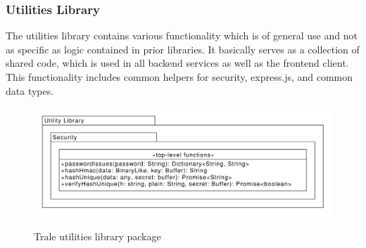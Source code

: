 \subsubsection{Utilities Library}
The utilities library contains various functionality which is of general use and not as specific as logic contained in
prior libraries.
It basically serves as a collection of shared code, which is used in all backend services as well as the frontend
client.
This functionality includes common helpers for security, express.js, and common data types.

\begin{figure}[H]
    \centering
    \caption{Trale utilities library package}
    \includegraphics[width=1\textwidth]{./graphics/classDiagramUtilitiesLibrary}
    \label{fig:figure39}
\end{figure}
